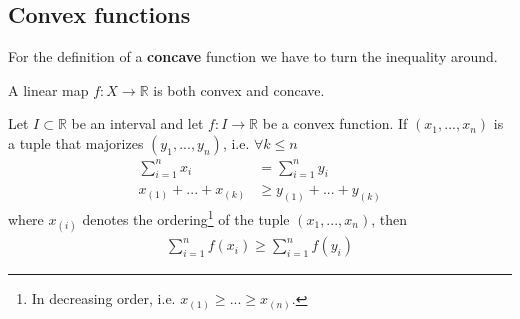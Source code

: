 \subsection{Convex functions}

	\begin{remark}
		For the definition of a \textbf{concave} function we have to turn the inequality around.
	\end{remark}
	\begin{result}
		A linear map $f:X\rightarrow\mathbb{R}$ is both convex and concave.
	\end{result}
	
	\begin{theorem}
		Let $I\subset\mathbb{R}$ be an interval and let $f:I\rightarrow\mathbb{R}$ be a convex function. If $(x_1, ..., x_n)$ is a tuple that majorizes $(y_1, ..., y_n)$, i.e. $\forall k\leq n$
		\begin{align}
			\sum_{i=1}^nx_i &= \sum_{i=1}^ny_i\\
			x_{(1)} + ... + x_{(k)}&\geq y_{(1)} + ... + y_{(k)}
		\end{align}
		where $x_{(i)}$ denotes the ordering\footnote{In decreasing order, i.e. $x_{(1)}\geq...\geq x_{(n)}$.} of the tuple $(x_1, ..., x_n)$, then
		\begin{gather}
			\sum_{i=1}^nf(x_i)\geq \sum_{i=1}^nf(y_i)
		\end{gather}
	\end{theorem}
